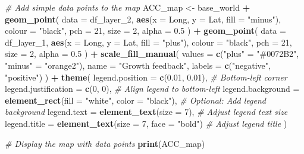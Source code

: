 \documentclass[
  11pt,
]{article}
\newenvironment{Shaded}{\begin{snugshade}}{\end{snugshade}}
\newcommand{\AttributeTok}[1]{\textcolor[rgb]{0.13,0.29,0.53}{#1}}
\newcommand{\CommentTok}[1]{\textcolor[rgb]{0.56,0.35,0.01}{\textit{#1}}}
\newcommand{\DecValTok}[1]{\textcolor[rgb]{0.00,0.00,0.81}{#1}}
\newcommand{\FloatTok}[1]{\textcolor[rgb]{0.00,0.00,0.81}{#1}}
\newcommand{\FunctionTok}[1]{\textcolor[rgb]{0.13,0.29,0.53}{\textbf{#1}}}
\newcommand{\NormalTok}[1]{#1}
\newcommand{\OtherTok}[1]{\textcolor[rgb]{0.56,0.35,0.01}{#1}}
\newcommand{\SpecialCharTok}[1]{\textcolor[rgb]{0.81,0.36,0.00}{\textbf{#1}}}
\newcommand{\StringTok}[1]{\textcolor[rgb]{0.31,0.60,0.02}{#1}}
\begin{document}
\begin{Shaded}
\begin{Highlighting}[]
\CommentTok{\# Add simple data points to the map}
\NormalTok{ACC\_map }\OtherTok{\textless{}{-}}\NormalTok{ base\_world }\SpecialCharTok{+}
  \FunctionTok{geom\_point}\NormalTok{(}
    \AttributeTok{data =}\NormalTok{ df\_layer\_2,}
    \FunctionTok{aes}\NormalTok{(}\AttributeTok{x =}\NormalTok{ Long, }\AttributeTok{y =}\NormalTok{ Lat, }\AttributeTok{fill =} \StringTok{"minus"}\NormalTok{),}
    \AttributeTok{colour =} \StringTok{"black"}\NormalTok{,}
    \AttributeTok{pch =} \DecValTok{21}\NormalTok{,}
    \AttributeTok{size =} \DecValTok{2}\NormalTok{,}
    \AttributeTok{alpha =} \FloatTok{0.5}
\NormalTok{  ) }\SpecialCharTok{+}
  \FunctionTok{geom\_point}\NormalTok{(}
    \AttributeTok{data =}\NormalTok{ df\_layer\_1,}
    \FunctionTok{aes}\NormalTok{(}\AttributeTok{x =}\NormalTok{ Long, }\AttributeTok{y =}\NormalTok{ Lat, }\AttributeTok{fill =} \StringTok{"plus"}\NormalTok{),}
    \AttributeTok{colour =} \StringTok{"black"}\NormalTok{,}
    \AttributeTok{pch =} \DecValTok{21}\NormalTok{,}
    \AttributeTok{size =} \DecValTok{2}\NormalTok{,}
    \AttributeTok{alpha =} \FloatTok{0.5}
\NormalTok{  ) }\SpecialCharTok{+}
  \FunctionTok{scale\_fill\_manual}\NormalTok{(}
    \AttributeTok{values =} \FunctionTok{c}\NormalTok{(}\StringTok{"plus"} \OtherTok{=} \StringTok{"\#0072B2"}\NormalTok{, }\StringTok{"minus"} \OtherTok{=} \StringTok{"orange2"}\NormalTok{),}
    \AttributeTok{name =} \StringTok{"Growth feedback"}\NormalTok{,}
    \AttributeTok{labels =} \FunctionTok{c}\NormalTok{(}\StringTok{"negative"}\NormalTok{, }\StringTok{"positive"}\NormalTok{)}
\NormalTok{  ) }\SpecialCharTok{+}
  \FunctionTok{theme}\NormalTok{(}
    \AttributeTok{legend.position =} \FunctionTok{c}\NormalTok{(}\FloatTok{0.01}\NormalTok{, }\FloatTok{0.01}\NormalTok{),  }\CommentTok{\# Bottom{-}left corner}
    \AttributeTok{legend.justification =} \FunctionTok{c}\NormalTok{(}\DecValTok{0}\NormalTok{, }\DecValTok{0}\NormalTok{),  }\CommentTok{\# Align legend to bottom{-}left}
    \AttributeTok{legend.background =} \FunctionTok{element\_rect}\NormalTok{(}\AttributeTok{fill =} \StringTok{"white"}\NormalTok{, }\AttributeTok{color =} \StringTok{"black"}\NormalTok{),  }\CommentTok{\# Optional: Add legend background}
    \AttributeTok{legend.text =} \FunctionTok{element\_text}\NormalTok{(}\AttributeTok{size =} \DecValTok{7}\NormalTok{),  }\CommentTok{\# Adjust legend text size}
    \AttributeTok{legend.title =} \FunctionTok{element\_text}\NormalTok{(}\AttributeTok{size =} \DecValTok{7}\NormalTok{, }\AttributeTok{face =} \StringTok{"bold"}\NormalTok{)  }\CommentTok{\# Adjust legend title}
\NormalTok{  )}

\CommentTok{\# Display the map with data points}
\FunctionTok{print}\NormalTok{(ACC\_map)}
\end{Highlighting}
\end{Shaded}
\end{document}
